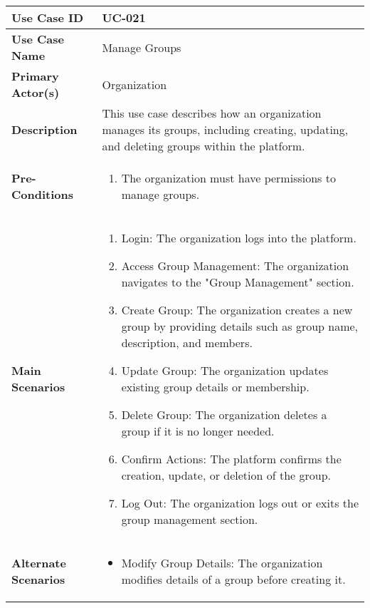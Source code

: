 \begin{table}[!ht]
    \centering
    \renewcommand{\arraystretch}{1.3} %
    \begin{tabularx}{\textwidth}{|l|X|}
        \hline
        \textbf{Use Case ID} & UC-021 \\
        \hline
        \textbf{Use Case Name} & Manage Groups \\
        \hline
        \textbf{Primary Actor(s)} & Organization \\
        \hline
        \textbf{Description} & This use case describes how an organization manages its groups, including creating, updating, and deleting groups within the platform. \\
        \hline
        \textbf{Pre-Conditions} & 
        \begin{enumerate}[label=\arabic*.,itemsep=0pt]
            \item The organization must have permissions to manage groups.
        \end{enumerate} \\
        \hline
        \textbf{Main Scenarios} & 
        \begin{enumerate}[label=\arabic*.,itemsep=0pt]
            \item Login: The organization logs into the platform.
            \item Access Group Management: The organization navigates to the "Group Management" section.
            \item Create Group: The organization creates a new group by providing details such as group name, description, and members.
            \item Update Group: The organization updates existing group details or membership.
            \item Delete Group: The organization deletes a group if it is no longer needed.
            \item Confirm Actions: The platform confirms the creation, update, or deletion of the group.
            \item Log Out: The organization logs out or exits the group management section.
        \end{enumerate} \\
        \hline
        \textbf{Alternate Scenarios} & 
        \begin{itemize}[label=--,itemsep=0pt]
            \item Modify Group Details: The organization modifies details of a group before creating it.

\end{itemize}
\end{tabularx}
\end{table}
